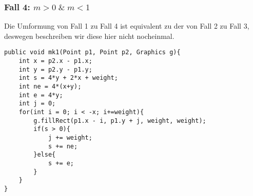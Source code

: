 \documentclass[a4paper,10pt]{article}
\begin{document}
\subsubsection{Fall 4: $m > 0 \;\&\; m < 1$}
Die Umformung von Fall 1 zu Fall 4 ist equivalent zu der von Fall 2 zu Fall 3, deswegen beschreiben wir diese hier nicht nocheinmal.
\begin{lstlisting}
public void mk1(Point p1, Point p2, Graphics g){
    int x = p2.x - p1.x;
    int y = p2.y - p1.y;
    int s = 4*y + 2*x + weight;
    int ne = 4*(x+y);
    int e = 4*y;
    int j = 0;
    for(int i = 0; i < -x; i+=weight){
        g.fillRect(p1.x - i, p1.y + j, weight, weight);
        if(s > 0){
            j += weight;
            s += ne;
        }else{
            s += e;
        }
    }
}
\end{lstlisting}
\end{document}
